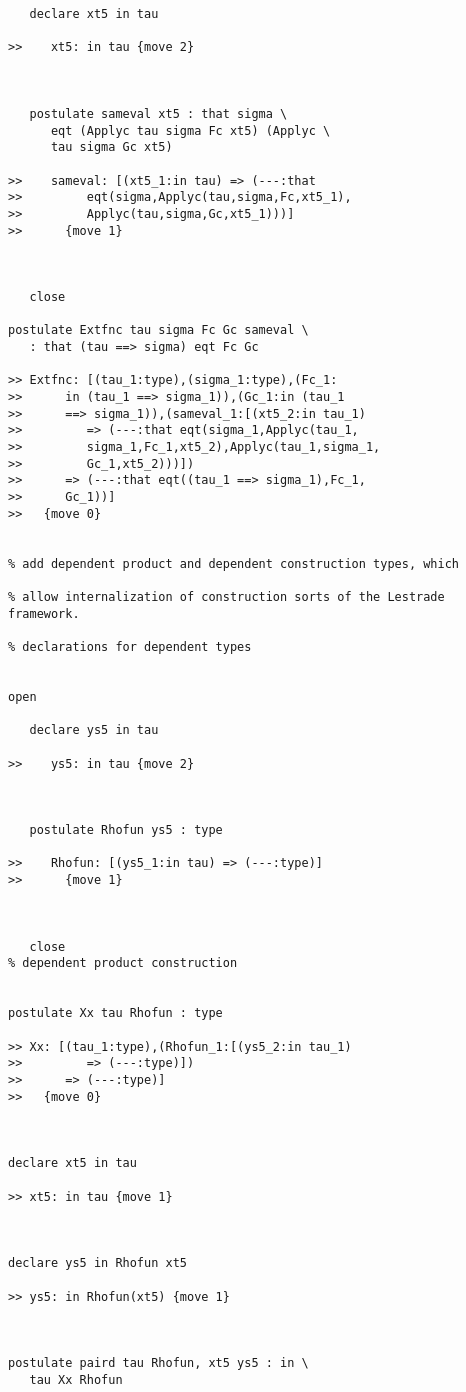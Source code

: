 \documentclass[12pt]{article}
\begin{document}
\begin{verbatim}
   declare xt5 in tau

>>    xt5: in tau {move 2}



   postulate sameval xt5 : that sigma \
      eqt (Applyc tau sigma Fc xt5) (Applyc \
      tau sigma Gc xt5)

>>    sameval: [(xt5_1:in tau) => (---:that
>>         eqt(sigma,Applyc(tau,sigma,Fc,xt5_1),
>>         Applyc(tau,sigma,Gc,xt5_1)))]
>>      {move 1}



   close

postulate Extfnc tau sigma Fc Gc sameval \
   : that (tau ==> sigma) eqt Fc Gc

>> Extfnc: [(tau_1:type),(sigma_1:type),(Fc_1:
>>      in (tau_1 ==> sigma_1)),(Gc_1:in (tau_1
>>      ==> sigma_1)),(sameval_1:[(xt5_2:in tau_1)
>>         => (---:that eqt(sigma_1,Applyc(tau_1,
>>         sigma_1,Fc_1,xt5_2),Applyc(tau_1,sigma_1,
>>         Gc_1,xt5_2)))])
>>      => (---:that eqt((tau_1 ==> sigma_1),Fc_1,
>>      Gc_1))]
>>   {move 0}


% add dependent product and dependent construction types, which 

% allow internalization of construction sorts of the Lestrade framework.

% declarations for dependent types


open

   declare ys5 in tau

>>    ys5: in tau {move 2}



   postulate Rhofun ys5 : type

>>    Rhofun: [(ys5_1:in tau) => (---:type)]
>>      {move 1}



   close
% dependent product construction


postulate Xx tau Rhofun : type

>> Xx: [(tau_1:type),(Rhofun_1:[(ys5_2:in tau_1)
>>         => (---:type)])
>>      => (---:type)]
>>   {move 0}



declare xt5 in tau

>> xt5: in tau {move 1}



declare ys5 in Rhofun xt5

>> ys5: in Rhofun(xt5) {move 1}



postulate paird tau Rhofun, xt5 ys5 : in \
   tau Xx Rhofun


\end{verbatim}
\end{document}
